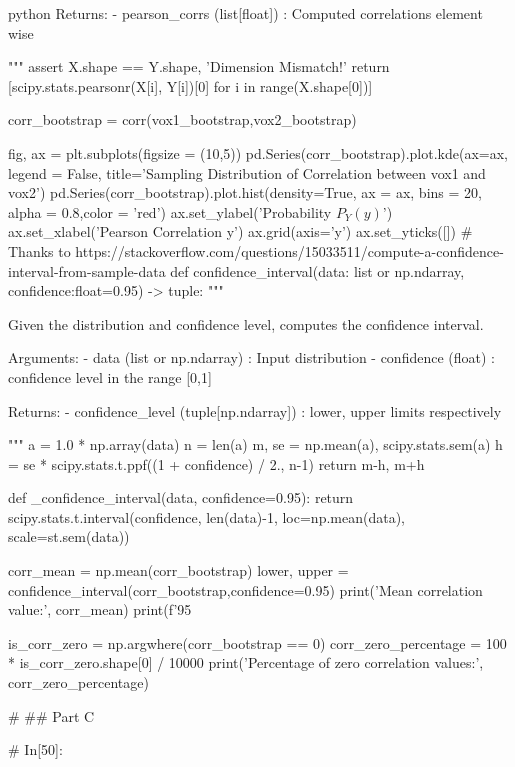 \documentclass[12pt]{amsart}
\begin{document}
\begin{mintedbox}{python}
            Returns:
                - pearson_corrs (list[float]) : Computed correlations element wise

    
    """
    assert X.shape == Y.shape, 'Dimension Mismatch!'
    return [scipy.stats.pearsonr(X[i], Y[i])[0] for i in range(X.shape[0])]

corr_bootstrap = corr(vox1_bootstrap,vox2_bootstrap)

fig, ax = plt.subplots(figsize = (10,5))
pd.Series(corr_bootstrap).plot.kde(ax=ax, legend = False, title='Sampling Distribution of Correlation between vox1 and vox2')
pd.Series(corr_bootstrap).plot.hist(density=True, ax = ax, bins = 20, alpha = 0.8,color = 'red')
ax.set_ylabel('Probability $P_Y(y)$')
ax.set_xlabel('Pearson Correlation y')
ax.grid(axis='y')
ax.set_yticks([])
# Thanks to https://stackoverflow.com/questions/15033511/compute-a-confidence-interval-from-sample-data
def confidence_interval(data: list or np.ndarray, confidence:float=0.95) -> tuple:
    """
    
        Given the distribution and confidence level, computes the confidence interval.
            
            Arguments:
                - data (list or np.ndarray) : Input distribution
                - confidence (float) : confidence level in the range [0,1]
            
            
            Returns:
                - confidence_level (tuple[np.ndarray]) : lower, upper limits respectively
        
        
    
    """
    a = 1.0 * np.array(data)
    n = len(a)
    m, se = np.mean(a), scipy.stats.sem(a)
    h = se * scipy.stats.t.ppf((1 + confidence) / 2., n-1)
    return m-h, m+h
 
def _confidence_interval(data, confidence=0.95):    
    return scipy.stats.t.interval(confidence, len(data)-1, loc=np.mean(data), scale=st.sem(data))

corr_mean = np.mean(corr_bootstrap)
lower, upper = confidence_interval(corr_bootstrap,confidence=0.95)
print('Mean correlation value:', corr_mean)
print(f'95%

is_corr_zero = np.argwhere(corr_bootstrap == 0)
corr_zero_percentage = 100 * is_corr_zero.shape[0] / 10000
print('Percentage of zero correlation values:', corr_zero_percentage)


# ## Part C

# In[50]:



\end{mintedbox}
\end{document}
